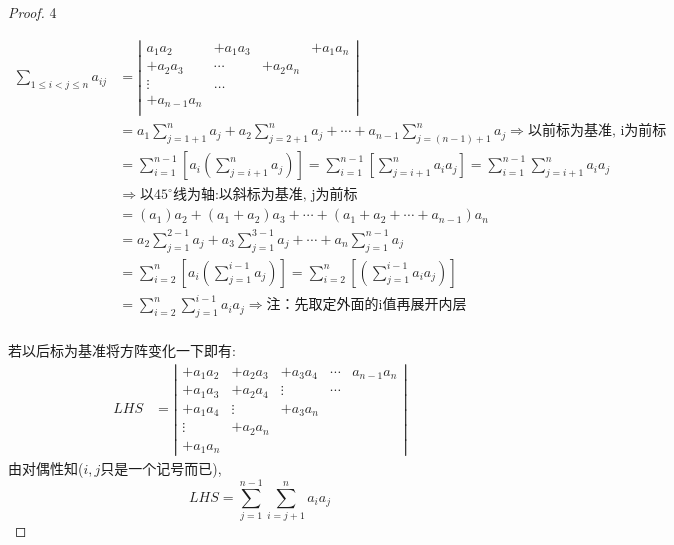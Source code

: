 \clearpage
\begin{proof}\num{4}

\begin{align*}
    \sum\limits_{1 \leq i<j \leq n} a_{i j}
    &=\left|
    \begin{array}{cccc}
        a_{1}a_{2} & +a_{1} a_{3} & & +a_{1} a_{n} \\
        +a_{2} a_{3} & \cdots & +a_{2} a_{n} & \\
        \vdots & \ldots & & \\
        +a_{n-1} a_{n} & & &\\
    \end{array}
    \right|\\
    &=a_{1}\sum_{j=1+1}^{n} a_{j}+a_{2} \sum_{j=2+1}^{n} a_{j}+\cdots+a_{n-1} \sum_{j=(n-1)+1}^{n} a_{j}
    \Longrightarrow\mbox{以前标为基准, i为前标} \\
    &=\sum_{i=1}^{n-1}\left[a_{i}\left(\sum_{j=i+1}^{n} a_{j}\right)\right] 
    =\sum_{i=1}^{n-1}\left[\sum_{j=i+1}^{n} a_{i} a_{j}\right]
    =\sum_{i=1}^{n-1} \sum_{j=i+1}^{n} a_{i} a_{j}\\
    & \Longrightarrow\mbox{以}45^{\circ}\mbox{线为轴:以斜标为基准, j为前标}\\
    & = \left(a_{1}\right) a_{2}+\left(a_{1}+a_{2}\right) a_{3}+\cdots+\left(a_{1}+a_{2}+\cdots+a_{n-1}\right) a_{n}\\
    & = a_{2} \sum_{j=1}^{2-1} a_{j}+a_{3} \sum_{j=1}^{3-1} a_{j}+\cdots+a_{n}\sum_{j=1}^{n-1} a_{j}\\
    & =\sum_{i=2}^{n}\left[a_{i}\left(\sum_{j=1}^{i-1} a_{j}\right)\right]
    =\sum_{i=2}^{n}\left[\left(\sum_{j=1}^{i-1} a_{i} a_{j}\right)\right] \\
    & =\sum_{i=2}^{n} \sum_{j=1}^{i-1} a_{i} a_{j} \Longrightarrow  \mbox{注：先取定外面的i值再展开内层}\\
\end{align*}

若以后标为基准将方阵变化一下即有:
\begin{align*}
 LHS&=\left|
    \begin{array}{ccccc}
        +a_{1} a_{2} & +a_{2} a_{3} & +a_{3} a_{4} & \cdots & a_{n-1} a_{n} \\
        +a_{1} a_{3} & +a_{2} a_{4} & \vdots & \cdots& \\
        +a_{1} a_{4} & \vdots & +a_{3} a_{n} & & \\
        \vdots & +a_{2} a_{n} & & & \\
        +a_{1} a_{n} & & &
    \end{array}
    \right|
\end{align*}
由对偶性知($i, j$只是一个记号而已), 
\[
    LHS=\sum_{j=1}^{n-1}\sum_{i=j+1}^{n}a_{i}a_{j}    
\]
\end{proof}



